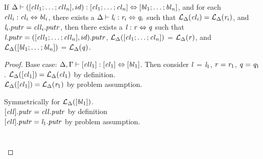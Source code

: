 \begin{lemma}
\label{lem:id-dnf}
If $\Delta \vdash ([\mathit{cll}_1 ; \ldots ; \mathit{cll}_n],id) : [\mathit{cl}_1 ; \ldots ; \mathit{cl}_n] \Leftrightarrow [\mathit{bl}_1 ; \ldots ; \mathit{bl}_n]$,
and for each $\mathit{cll}_i : \mathit{cl}_i \Leftrightarrow \mathit{bl}_i$,
there exists a $\Delta \vdash \mathit{l}_i : \mathit{r}_i \Leftrightarrow \mathit{q}_i$ such that
$\mathcal{L}_{\Delta}(\mathit{cl}_i)=\mathcal{L}_{\Delta}(\mathit{r}_i)$, and $\mathit{l}_i.putr = \mathit{cll}_i.putr$,
then there exists a $\mathit{l} : \mathit{r} \Leftrightarrow \mathit{q}$ such that $\mathit{l}.putr = ([\mathit{cll}_1 ; \ldots ; \mathit{cll}_n],id).putr$, $\mathcal{L}_{\Delta}([\mathit{cl}_1 ; \ldots ; \mathit{cl}_n])$ = $\mathcal{L}_{\Delta}(\mathit{r})$,
and $\mathcal{L}_{\Delta}([\mathit{bl}_1 ; \ldots ; \mathit{bl}_n])$ = $\mathcal{L}_{\Delta}(\mathit{q})$.
\begin{proof}
Base case: $\Delta, \Gamma \vdash [\mathit{cll}_1] : [\mathit{cl}_1] \Leftrightarrow [\mathit{bl}_1]$.  Then consider $\mathit{l}$ = $\mathit{l}_1$, $\mathit{r} = \mathit{r}_1$, $\mathit{q} = \mathit{q}_1$.
$\mathcal{L}_{\Delta}([\mathit{cl}_1]) = \mathcal{L}_{\Delta}(\mathit{cl}_1)$ by definition.\\
$\mathcal{L}_{\Delta}([\mathit{cl}_1]) = \mathcal{L}_{\Delta}(\mathit{r}_1)$ by problem assumption.

Symmetrically for $\mathcal{L}_{\Delta}([\mathit{bl}_1])$.\\
$[\mathit{cll}]\mathit{.putr} = \mathit{cll}\mathit{.putr}$ by definition\\
$[\mathit{cll}]\mathit{.putr} = \mathit{l}_1\mathit{.putr}$ by problem assumption.
\\\\\\




\end{proof}
\end{lemma}
